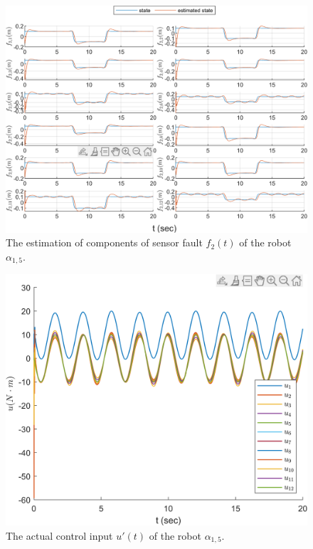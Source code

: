 \documentclass{ieeeaccess}
\begin{document}
\begin{figure}[htbp]
    \centering
    \includegraphics[scale=.57]{fig/robot (3).png}\caption{The estimation of components of sensor fault $f_2(t)$ of the robot $\alpha_{1,5}$.}%
    \label{fig:robot, fs}
\end{figure}
\begin{figure}[htbp]
    \centering
    \includegraphics[scale=.57]{fig/robot (4).png}\caption{The actual control input $u'(t)$ of the robot $\alpha_{1,5}$.}%
    \label{fig:robot, control}
\end{figure}
\end{document}
